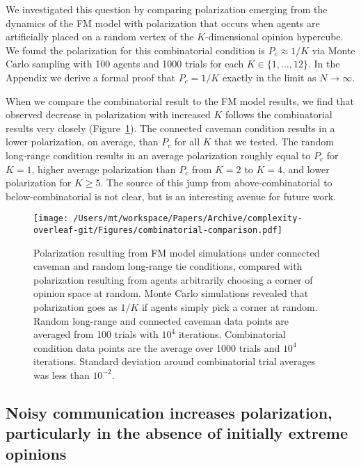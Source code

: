 We investigated this question 
by comparing polarization emerging from the dynamics of the FM model with
polarization that occurs when agents are artificially placed on a random vertex of 
the $K$-dimensional opinion hypercube. We found the polarization for this
combinatorial condition is $P_{c} \approx 1/K$ via Monte Carlo 
sampling with 100 agents and 1000 trials for each $K \in \{1, \ldots, 12\}$.  
In the Appendix we derive a formal proof that $P_{c} = 1/K$ exactly in the limit as $N \rightarrow \infty$.

When we compare the combinatorial result to the FM model results, 
we find that observed decrease in polarization with increased $K$ follows the combinatorial results very closely (Figure~\ref{fig:combinatorial-comparison}).
The connected caveman condition results in a lower polarization, on average,
than $P_{c}$ for all $K$ that we tested. The random long-range condition results in an 
average polarization roughly equal to $P_{c}$ for $K=1$, higher average polarization 
than $P_{c}$ from $K=2$ to $K=4$, and lower polarization for $K \geq 5$. The
source of this jump from above-combinatorial to below-combinatorial is not
clear, but is an interesting avenue for future work.


\begin{figure}[H]
  \centering
    \texttt{[image: /Users/mt/workspace/Papers/Archive/complexity-overleaf-git/Figures/combinatorial-comparison.pdf]}
  \caption{Polarization resulting from FM model simulations under connected caveman and random long-range tie conditions, compared with polarization resulting from agents arbitrarily choosing a corner of opinion space at random. Monte Carlo simulations revealed that polarization goes as $1/K$ if agents
    simply pick a corner at random. Random long-range and connected caveman
    data points are averaged from 100 trials with $10^4$ iterations. 
    Combinatorial condition data points are the average over 1000 trials 
    and $10^4$ iterations. Standard deviation around combinatorial trial averages was
    less than $10^{-2}$.
  }
  \label{fig:combinatorial-comparison}
\end{figure}

\subsection{Noisy communication increases polarization, particularly in the
absence of initially extreme opinions}

